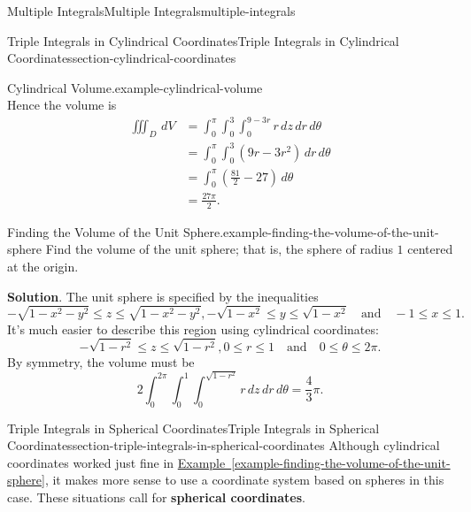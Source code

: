 \documentclass[oneside,10pt,]{book}
\newcommand{\terminology}[1]{\textbf{#1}}
\numberwithin{equation}{section}
\newcommand{\qq}[1]{\quad\text{#1}\quad}
\newcommand{\amp}{&}
\begin{document}
\begin{chapterptx}{Multiple Integrals}{}{Multiple Integrals}{}{}{multiple-integrals}
\begin{sectionptx}{Triple Integrals in Cylindrical Coordinates}{}{Triple Integrals in Cylindrical Coordinates}{}{}{section-cylindrical-coordinates}
\begin{example}{Cylindrical Volume.}{example-cylindrical-volume}
\begin{equation*}
\end{equation*}
Hence the volume is%
\begin{align*}
\iiint_{D}\,dV \amp = \int_{0}^{\pi}\int_{0}^{3}\int_{0}^{9-3r}r\,dz\,dr\,d\theta \\
\amp = \int_{0}^{\pi}\int_{0}^{3}(9r - 3r^{2})\,dr\,d\theta \\
\amp = \int_{0}^{\pi}\left(\frac{81}{2} - 27\right)\,d\theta \\
\amp = \frac{27\pi}{2} \text{.}
\end{align*}
%
\end{example}
\begin{example}{Finding the Volume of the Unit Sphere.}{example-finding-the-volume-of-the-unit-sphere}%
\hypertarget{p-1529}{}%
Find the volume of the unit sphere; that is, the sphere of radius \(1\) centered at the origin.%
\par\smallskip%
\noindent\textbf{Solution}.\hypertarget{solution-254}{}\quad%
\hypertarget{p-1530}{}%
The unit sphere is specified by the inequalities%
\begin{equation*}
-\sqrt{1 - x^{2} - y^{2}} \leq z \leq \sqrt{1 - x^{2} - y^{2}}, -\sqrt{1 - x^{2}} \leq y \leq \sqrt{1 - x^{2}} \qq{and} -1\leq x\leq 1\text{.}
\end{equation*}
It's much easier to describe this region using cylindrical coordinates:%
\begin{equation*}
-\sqrt{1 - r^{2}}\leq z\leq \sqrt{1 - r^{2}}, 0\leq r\leq 1\qq{and} 0\leq \theta\leq 2\pi\text{.}
\end{equation*}
By symmetry, the volume must be%
\begin{equation*}
2\int_{0}^{2\pi}\int_{0}^{1}\int_{0}^{\sqrt{1 - r^{2}}}r\,dz\,dr\,d\theta = \frac{4}{3}\pi\text{.}
\end{equation*}
%
\end{example}
\end{sectionptx}
%
%
\typeout{************************************************}
\typeout{************************************************}
%
\begin{sectionptx}{Triple Integrals in Spherical Coordinates}{}{Triple Integrals in Spherical Coordinates}{}{}{section-triple-integrals-in-spherical-coordinates}
\hypertarget{p-1531}{}%
Although cylindrical coordinates worked just fine in \hyperref[example-finding-the-volume-of-the-unit-sphere]{Example~\ref{example-finding-the-volume-of-the-unit-sphere}}, it makes more sense to use a coordinate system based on spheres in this case. These situations call for \terminology{spherical coordinates}.%

\end{sectionptx}
\end{chapterptx}
\end{document}
